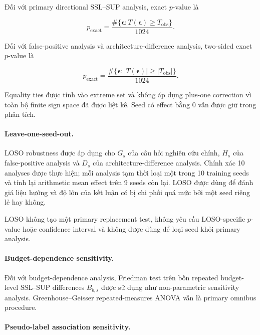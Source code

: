 \documentclass[pdflatex,sn-mathphys-num]{sn-jnl}%
\theoremstyle{thmstyleone}%
\theoremstyle{thmstyletwo}%
\theoremstyle{thmstylethree}%
\begin{document}
Đối với primary directional SSL--SUP analysis, exact \(p\)-value là

\begin{equation}
p_{\mathrm{exact}}
=
\frac{
\#\{
\boldsymbol{\epsilon}:
T(\boldsymbol{\epsilon})\geq T_{\mathrm{obs}}
\}
}{1024}.
\label{eq:exact_signflip_one_sided}
\end{equation}

Đối với false-positive analysis và architecture-difference
analysis, two-sided exact \(p\)-value là

\begin{equation}
p_{\mathrm{exact}}
=
\frac{
\#\{
\boldsymbol{\epsilon}:
|T(\boldsymbol{\epsilon})|
\geq
|T_{\mathrm{obs}}|
\}
}{1024}.
\label{eq:exact_signflip_two_sided}
\end{equation}

Equality ties được tính vào extreme set và không áp dụng plus-one
correction vì toàn bộ finite sign space đã được liệt kê. Seed có effect
bằng \(0\) vẫn được giữ trong phân tích.

\paragraph{Leave-one-seed-out.}

LOSO robustness được áp dụng cho \(G_s\) của câu hỏi nghiên cứu chính,
\(H_s\) của false-positive analysis và \(D_s\) của
architecture-difference analysis. Chính xác 10 analyses được thực hiện;
mỗi analysis tạm thời loại một trong 10 training seeds và tính lại
arithmetic mean effect trên 9 seeds còn lại. LOSO được dùng để đánh giá
liệu hướng và độ lớn của kết luận có bị chi phối quá mức bởi một seed
riêng lẻ hay không.

LOSO không tạo một primary replacement test, không yêu cầu LOSO-specific
\(p\)-value hoặc confidence interval và không được dùng để loại seed khỏi
primary analysis.

\paragraph{Budget-dependence sensitivity.}

Đối với budget-dependence analysis, Friedman test trên bốn repeated
budget-level SSL--SUP differences \(B_{b,s}\) được sử dụng như non-parametric
sensitivity analysis. Greenhouse--Geisser repeated-measures ANOVA vẫn là
primary omnibus procedure.

\paragraph{Pseudo-label association sensitivity.}
\end{document}

